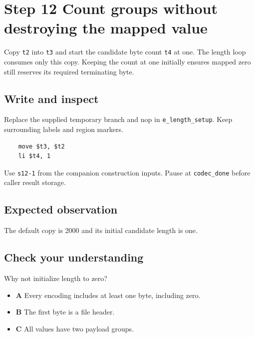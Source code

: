 \section{Step 12 Count groups without destroying the mapped value}\label{delta-s12}

Copy \texttt{t2} into \texttt{t3} and start the candidate byte count \texttt{t4} at one. The length loop consumes only this copy. Keeping the count at one initially ensures mapped zero still reserves its required terminating byte.

\subsection{Write and inspect}
Replace the supplied temporary branch and nop in \texttt{e\_length\_setup}. Keep surrounding labels and region markers.

\begin{verbatim}
    move $t3, $t2
    li $t4, 1
\end{verbatim}
Use \texttt{s12-1} from the companion construction inputs. Pause at \texttt{codec\_done} before caller result storage.

\subsection{Expected observation}
The default copy is 2000 and its initial candidate length is one.

\subsection{Check your understanding}
Why not initialize length to zero?

\begin{itemize}
  \item \textbf{A} Every encoding includes at least one byte, including zero.
  \item \textbf{B} The first byte is a file header.
  \item \textbf{C} All values have two payload groups.
\end{itemize}
